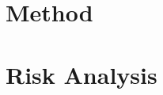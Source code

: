 \documentclass[12pt]{article} %
\begin{document}
\section{Method}




\section{Risk Analysis} %









\newpage

\begin{appendices}

\end{appendices}
\end{document}
